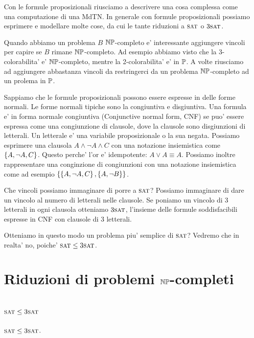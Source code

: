 Con le formule proposizionali riusciamo a descrivere una cosa complessa come una computazione di una
MdTN. In generale con formule proposizionali possiamo esprimere e modellare molte cose, da cui le
tante riduzioni a $\textsc{sat}$ o $3\textsc{sat}$.

Quando abbiamo un problema $B$ $\mathbb{NP}$-completo e' interessante aggiungere vincoli per capire se
$B$ rimane $\mathbb{NP}$-completo. Ad esempio abbiamo visto che la 3-colorabilita' e'
$\mathbb{NP}$-completo, mentre la 2-colorabilita' e' in $\mathbb{P}$. A volte riusciamo ad aggiungere
abbastanza vincoli da restringerci da un problema $\mathbb{NP}$-completo ad un prolema in $\mathbb{P}$.

Sappiamo che le formule proposizionali possono essere espresse in delle forme normali. Le forme
normali tipiche sono la congiuntiva e disgiuntiva.  Una formula e' in forma normale congiuntiva
(Conjunctive normal form, CNF) se puo' essere espressa come una congiunzione di clausole, dove la
clausole sono disgiunzioni di letterali. Un letterale e' una variabile proposizionale o la sua
negata. Possiamo esprimere una clausola $A \land \lnot A \land C$ con una notazione insiemistica
come $\left\{A,\lnot A,C\right\}$. Questo perche' l'or e' idempotente: $A \lor A \equiv A$. Possiamo inoltre
rappresentare una conginzione di congiunzioni con una notazione insiemistica come ad esempio
$\left\{\left\{A,\lnot A,C\right\},\left\{A,\lnot B\right\}\right\}$.

Che vincoli possiamo immaginare di porre a $\textsc{sat}$? Possiamo immaginare di dare un vincolo al numero
di letterali nelle clausole. Se poniamo un vincolo di 3 letterali in ogni clausola otteniamo
$3\textsc{sat}$, l'insieme delle formule soddisfacibili espresse in CNF con clausole di 3 letterali.

Otteniamo in questo modo un problema piu' semplice di $\textsc{sat}$? Vedremo che in realta' no, poiche'
$\textsc{sat} \leq 3\textsc{sat}$.

\section{Riduzioni di problemi $\mathbb{NP}$-completi}

\subsection{$\textsc{sat} \leq 3\textsc{sat}$}


\begin{thm}
        $\textsc{sat} \leq 3\textsc{sat}$.
\end{thm}

